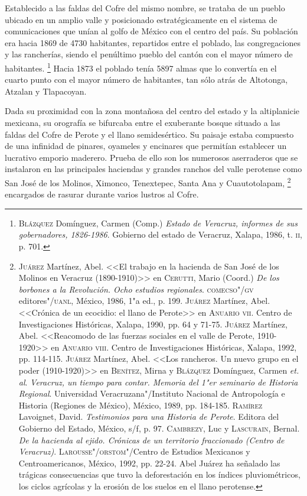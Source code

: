 \documentclass[14pt,twoside,final]{extbook} %
\let\oldfootnote\footnote
\renewcommand\footnote[1]{%
\oldfootnote{\hspace{1mm}#1}}
\begin{document}
Establecido a las faldas del Cofre del mismo nombre, se trataba de un pueblo ubicado en un amplio valle y posicionado estratégicamente en el sistema de comunicaciones que unían al golfo de México con el centro del país. Su población era hacia 1869 de 4730 habitantes, repartidos entre el poblado, las congregaciones y las rancherías, siendo el penúltimo pueblo del cantón con el mayor número de habitantes.\footnote{\textsc{Blázquez} Domínguez, Carmen (Comp.) \emph{Estado de Veracruz, informes de sus gobernadores, 1826-1986}. Gobierno del estado de Veracruz, Xalapa, 1986, t. \textsc{ii}, p. 701.} Hacia 1873 el poblado tenía 5897 almas que lo convertía en el cuarto punto con el mayor número de habitantes, tan sólo atrás de Altotonga, Atzalan y Tlapacoyan.

Dada su proximidad con la zona montañosa del centro del estado y la altiplanicie mexicana, su orografía se bifurcaba entre el exuberante bosque situado a las faldas del Cofre de Perote y el llano semidesértico. Su paisaje estaba compuesto de una infinidad de pinares, oyameles y encinares que permitían establecer un lucrativo emporio maderero. Prueba de ello son los numerosos aserraderos que se instalaron en las principales haciendas y grandes ranchos del valle perotense como San José de los Molinos, Ximonco, Tenextepec, Santa Ana y Cuautotolapam,\footnote{\textsc{Juárez} Martínez, Abel. <<El trabajo en la hacienda de San José de los Molinos en Veracruz \mbox{(1890-1910)}>> en \textsc{Cerutti}, Mario (Coord.) \emph{De los borbones a la Revolución. Ocho estudios regionales}. \textsc{comecso"/gv} editores"/\textsc{uanl}, México, 1986, 1"a ed., p. 199. \textsc{Juárez} Martínez, Abel. <<Crónica de un ecocidio: el llano de Perote>> en \textsc{Anuario vii}. Centro de Investigaciones Históricas, Xalapa, 1990, pp. 64 y 71-75. \textsc{Juárez} Martínez, Abel. <<Reacomodo de las fuerzas sociales en el valle de Perote, 1910-1920>> en \textsc{Anuario viii}. Centro de Investigaciones Históricas, Xalapa, 1992, pp. 114-115. \textsc{Juárez} Martínez, Abel. <<Los rancheros. Un nuevo grupo en el poder (1910-1920)>> en \textsc{Benítez}, Mirna y \textsc{Blázquez} Domínguez, Carmen \emph{et. al}. \emph{Veracruz, un tiempo para contar. Memoria del 1"er seminario de Historia Regional}. Universidad Veracruzana"/Instituto Nacional de Antropología e Historia (Regiones de México), México, 1989, pp. 184-185. \textsc{Ramírez} Lavoignet, David. \emph{Testimonios para una Historia de Perote}. Editora del Gobierno del Estado, México, s/f, p. 97. \textsc{Cambrezy}, Luc y \textsc{Lascurain}, Bernal. \emph{De la hacienda al ejido. Crónicas de un territorio fraccionado (Centro de Veracruz)}. \textsc{Larousse"/orstom}"/Centro de Estudios Mexicanos y Centroamericanos, México, 1992, pp. 22-24. Abel Juárez ha señalado las trágicas consecuencias que tuvo la deforestación en los índices pluviométricos, los ciclos agrícolas y la erosión de los suelos en el llano perotense.} encargados de rasurar durante varios lustros al Cofre.
\end{document}
